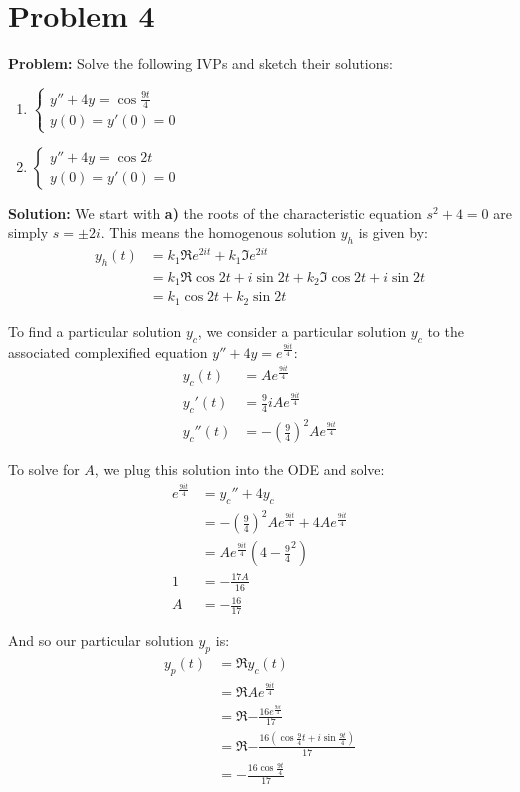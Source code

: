 \documentclass{article}
\begin{document}
\section*{Problem 4}
\noindent\textbf{Problem:} Solve the following IVPs and sketch their solutions:
\begin{enumerate}[label=\textbf{\alph*)}]
  \item $\begin{cases}
    y''+4y=\cos \frac{9t}{4}\\
    y(0)=y'(0)=0
  \end{cases}$
  \item $\begin{cases}
    y''+4y=\cos 2t\\
    y(0)=y'(0)=0
  \end{cases}$
\end{enumerate}
\bigskip

\noindent\textbf{Solution:} We start with \textbf{a)} the roots of the characteristic equation $s^2+4=0$ are simply $s=\pm 2i$. This means the homogenous solution $y_h$ is given by:
\begin{align*}
  y_h(t)&=k_1\Re{e^{2it}}+k_1\Im{e^{2it}}\\
  &=k_1\Re{\cos 2t+i\sin 2t}+k_2\Im{\cos 2t+i\sin 2t}\\
  &=k_1\cos2t+k_2\sin2t
\end{align*}

To find a particular solution $y_c$, we consider a particular solution $y_c$ to the associated complexified equation $y''+4y=e^{\frac{9it}{4}}$:
\begin{align*}
  y_c(t)&=Ae^{\frac{9it}{4}}\\
  y_c'(t)&=\frac{9}{4}iAe^{\frac{9it}{4}}\\
  y_c''(t)&=-\left(\frac{9}{4}\right)^2Ae^{\frac{9it}{4}}
\end{align*}

To solve for $A$, we plug this solution into the ODE and solve:
\begin{align*}
  e^{\frac{9it}{4}}&=y_c''+4y_c\\
  &=-\left(\frac{9}{4}\right)^2Ae^{\frac{9it}{4}}+4Ae^{\frac{9it}{4}}\\
  &=Ae^{\frac{9it}{4}}\left(4-\frac{9}{4}^2\right)\\
  1&=-\frac{17A}{16}\\
  A&=-\frac{16}{17}
\end{align*}

And so our particular solution $y_p$ is:
\begin{align*}
  y_p(t)&=\Re{y_c(t)}\\
  &=\Re{Ae^{\frac{9it}{4}}}\\
  &=\Re{-\frac{16e^{\frac{9it}{4}}}{17}}\\
  &=\Re{-\frac{16(\cos\frac{9}{4} t+i\sin\frac{9t}{4})}{17}}\\
  &=-\frac{16\cos\frac{9t}{4}}{17}
\end{align*}
\end{document}

